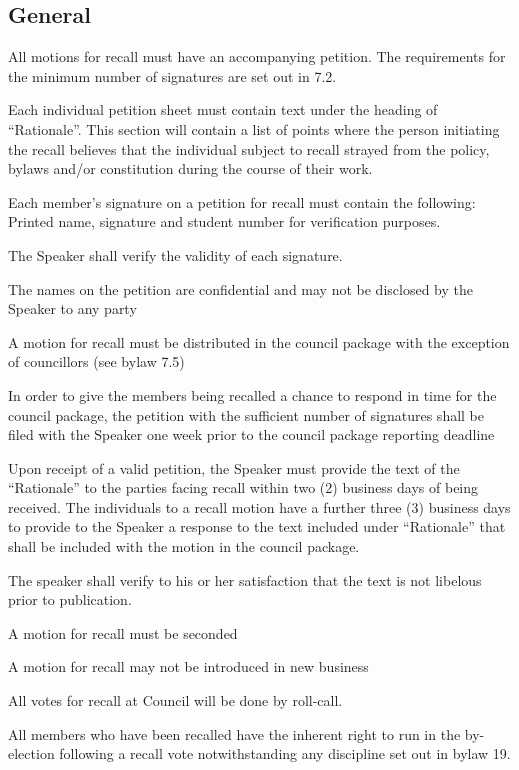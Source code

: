 \subsection{General}
\begin{longenum}[ label*=\thesubsection.\arabic*., align=left]
	\item  All motions for recall must have an accompanying petition. The requirements for the minimum
number of signatures are set out in 7.2.
	\begin{longenum}[ label*=\arabic*., align=left]
		\item Each individual petition sheet must contain text under the heading of ``Rationale''.  This section will contain a list of points where the person initiating the recall believes that the individual subject to recall strayed from the policy, bylaws and/or constitution during the course of their work.
        \item Each member's signature on a petition for recall must contain the following: Printed name, signature and student number for verification purposes.
        \item The Speaker shall verify the validity of each signature.
        \item The names on the petition are confidential and may not be disclosed by the Speaker to any party
    \end{longenum}
    \item A motion for recall must be distributed in the council package with the exception of councillors (see bylaw 7.5)
    \item In order to give the members being recalled a chance to respond in time for the council package, the petition with the sufficient number of signatures shall be filed with the Speaker one week prior to the council package reporting deadline
    \item Upon receipt of a valid petition, the Speaker must provide the text of the ``Rationale'' to the parties facing recall within two (2) business days of being received. The individuals to a recall motion have a further three (3) business days to provide to the Speaker a response to the text included under ``Rationale'' that shall be included with the motion in the council package.
    \item The speaker shall verify to his or her satisfaction that the text is not libelous prior to publication.
    \item A motion for recall must be seconded
    \item A motion for recall may not be introduced in new business
    \item All votes for recall at Council will be done by roll-call.
    \item All members who have been recalled have the inherent right to run in the by-election following a recall vote notwithstanding any discipline set out in bylaw 19.
\end{longenum}

